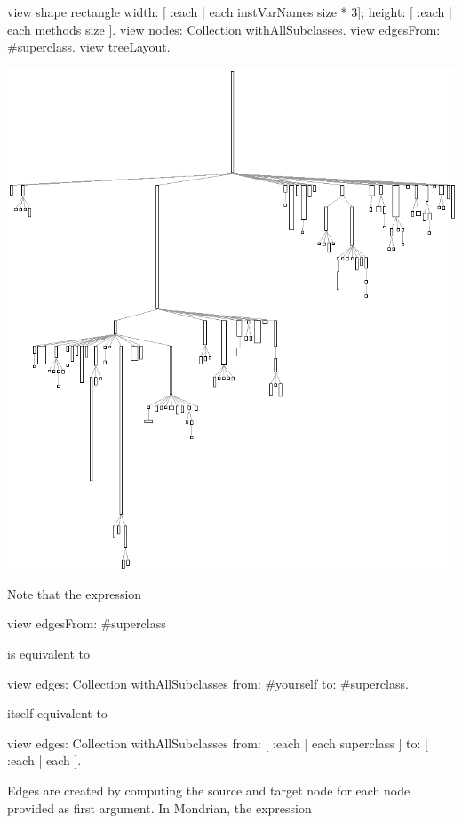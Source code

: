 \documentclass[a4paper,10pt,twoside]{book}
\begin{document}
\begin{code}{}
view shape rectangle
  width: [ :each | each instVarNames size * 3];
  height: [ :each | each methods size ].
view nodes: Collection withAllSubclasses.
view edgesFrom: #superclass.
view treeLayout.
\end{code}
\begin{center}\includegraphics[scale=0.4]{picture5}\end{center}


Note that the expression 
\begin{code}{}
view edgesFrom: #superclass
\end{code}

is equivalent to

\begin{code}{}
view edges: Collection withAllSubclasses from: #yourself to: #superclass.
\end{code}

itself equivalent to
\begin{code}{}
view 
  edges: Collection withAllSubclasses 
  from: [ :each | each superclass ] 
  to: [ :each | each  ].
\end{code}

Edges are created by computing the source and target node for each node provided as first argument. In Mondrian, the expression
\end{document}
